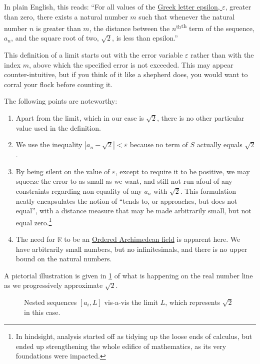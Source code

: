 \documentclass[
  a4paper,
]{article}
\begin{document}
In plain English, this reads: ``For all values of the
\href{https://mathworld.wolfram.com/Epsilon.html}{Greek letter epsilon,
\(\varepsilon\)}, greater than zero, there exists a natural number \(m\)
such that whenever the natural number \(n\) is greater than \(m\), the
distance between the \(n^{\textrm{th}}\)\textsuperscript{th} term of the
sequence, \(a_{n}\), and the square root of two, \(\sqrt{2}\), is less
than epsilon.''

This definition of a limit starts out with the error variable
\(\varepsilon\) rather than with the index \(m\), above which the
specified error is not exceeded. This may appear counter-intuitive, but
if you think of it like a shepherd does, you would want to corral your
flock before counting it.

The following points are noteworthy:

\begin{enumerate}
\item
  Apart from the limit, which in our case is \(\sqrt{2}\), there is no
  other particular value used in the definition.
\item
  We use the inequality \(|a_{n} - \sqrt{2}| < \varepsilon\) because no
  term of \(S\) actually equals \(\sqrt{2}\).
\item
  By being silent on the value of \(\varepsilon\), except to require it
  to be positive, we may squeeze the error to as small as we want, and
  still not run afoul of any constraints regarding non-equality of any
  \(a_{n}\) with \(\sqrt{2}\). This formulation neatly encapsulates the
  notion of ``tends to, or approaches, but does not equal'', with a
  distance measure that may be made arbitrarily small, but not equal
  zero.\footnote{In hindsight, analysis started off as tidying up the
    loose ends of calculus, but ended up strengthening the whole edifice
    of mathematics, as its very foundations were impacted.}
\item
  The need for \(\mathbb{R}\) to be an
  \hyperref[ordered-archimedean-field]{Ordered Archimedean field} is
  apparent here. We have arbitrarily small numbers, but no
  infinitesimals, and there is no upper bound on the natural numbers.
\end{enumerate}

A pictorial illustration is given in \cref{fig:nested} of what is
happening on the real number line as we progressively approximate
\(\sqrt{2}\).

\begin{figure}
\centering

\caption{Nested sequences \([a_i, L]\) vis-a-vis the limit \(L\), which
represents \(\sqrt{2}\) in this case.}\label{fig:nested}
\end{figure}
\end{document}
